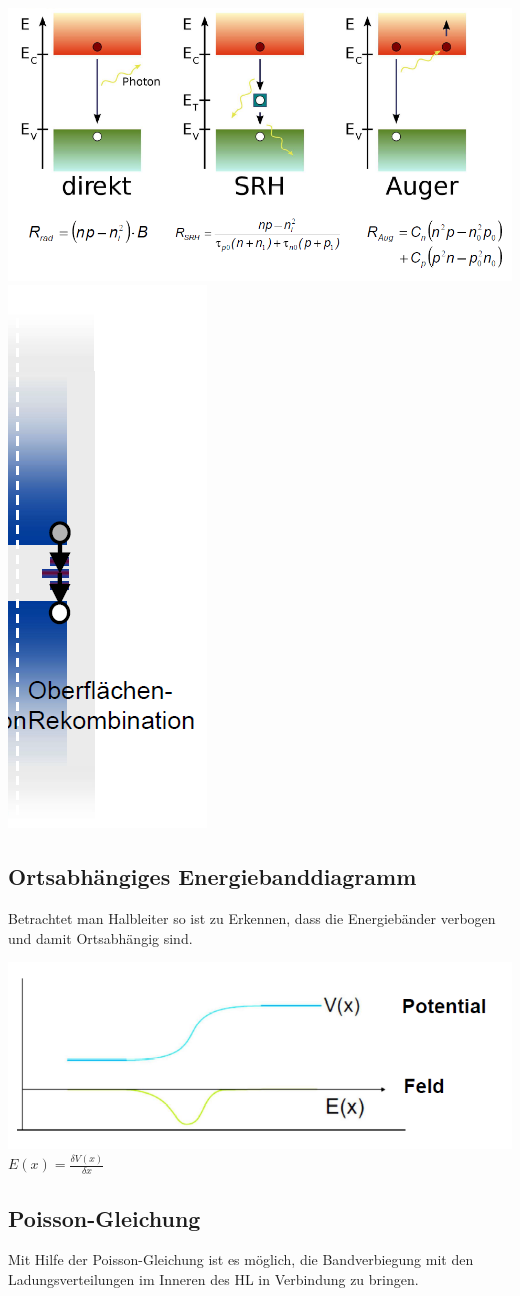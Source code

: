 \begin{center}
	
	\includegraphics[width=0.7\linewidth]{Kapitel/Kap05/Rekombinationsarten1.png}
	\includegraphics[width=0.15\linewidth]{Kapitel/Kap05/Rekombinationsarten2}
\end{center}

	
\subsection{Ortsabhängiges Energiebanddiagramm}
	Betrachtet man Halbleiter so ist zu Erkennen, dass die Energiebänder verbogen und damit Ortsabhängig sind.

\begin{center}
	\includegraphics[width=0.5\linewidth]{Kapitel/Kap05/Ortsabhaengiges_Energiebanddiagramm.png}
	$E(x) = \frac{\delta V(x)}{\delta x}$
\end{center}





\subsection{Poisson-Gleichung}
Mit Hilfe der Poisson-Gleichung ist es möglich, die Bandverbiegung mit den Ladungsverteilungen im Inneren des HL in Verbindung zu bringen.

